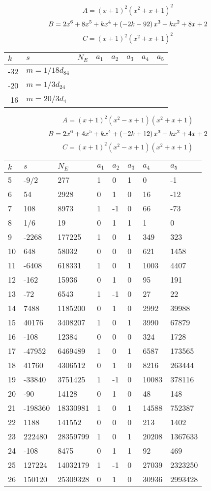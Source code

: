 \documentclass{amsart}
\begin{document}
$$A=(x
 + 1)^{2}(x^2
 + x
 + 1)^{2}$$
$$B=2\*x^6
 + 8\*x^5
 + k\*x^4
 + \left(-2\*k
 - 92\right) \*x^3
 + k\*x^2
 + 8\*x
 + 2$$
$$C=(x
 + 1)^{2}(x^2
 + x
 + 1)^{2}$$
\begin{longtable}{|l|l|l|lllll|}
\hline
$k$ & $s$ & $N_E$ & $a_1$ & $a_2$ & $a_3$ & $a_4$ & $a_5$\\
\hline
-32&$m=1/18d_{84}$&&\multicolumn{5}{c|}{}\\
-20&$m=1/3d_{24}$&&\multicolumn{5}{c|}{}\\
-16&$m=20/3d_{4}$&&\multicolumn{5}{c|}{}\\
\hline
\end{longtable}
$$A=(x
 + 1)^{2}(x^2
 - x
 + 1)(x^2
 + x
 + 1)$$
$$B=2\*x^6
 + 4\*x^5
 + k\*x^4
 + \left(-2\*k
 + 12\right) \*x^3
 + k\*x^2
 + 4\*x
 + 2$$
$$C=(x
 + 1)^{2}(x^2
 - x
 + 1)(x^2
 + x
 + 1)$$
\begin{longtable}{|l|l|l|lllll|}
\hline
$k$ & $s$ & $N_E$ & $a_1$ & $a_2$ & $a_3$ & $a_4$ & $a_5$\\
\hline
5&-9/2&277&1&0&1&0&-1\\
6&54&2928&0&1&0&16&-12\\
7&108&8973&1&-1&0&66&-73\\
8&1/6&19&0&1&1&1&0\\
9&-2268&177225&1&0&1&349&323\\
10&648&58032&0&0&0&621&1458\\
11&-6408&618331&1&0&1&1003&4407\\
12&-162&15936&0&1&0&95&191\\
13&-72&6543&1&-1&0&27&22\\
14&7488&1185200&0&1&0&2992&39988\\
15&40176&3408207&1&0&1&3990&67879\\
16&-108&12384&0&0&0&324&1728\\
17&-47952&6469489&1&0&1&6587&173565\\
18&41760&4306512&0&1&0&8216&263444\\
19&-33840&3751425&1&-1&0&10083&378116\\
20&-90&14128&0&1&0&48&148\\
21&-198360&18330981&1&0&1&14588&752387\\
22&1188&141552&0&0&0&213&1402\\
23&222480&28359799&1&0&1&20208&1367633\\
24&-108&8475&0&1&1&92&469\\
25&127224&14032179&1&-1&0&27039&2323250\\
26&150120&25309328&0&1&0&30936&2993428\\

\end{longtable}
\end{document}
